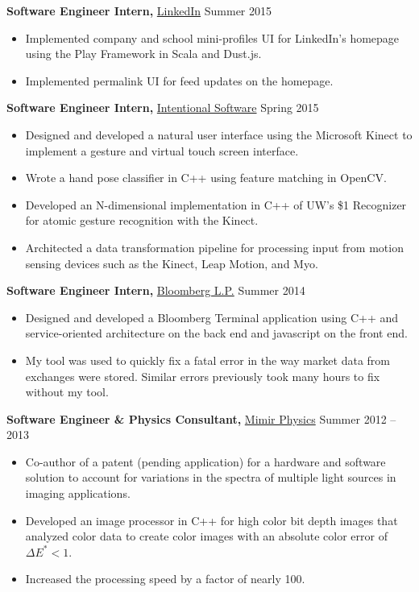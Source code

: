 \documentclass[margin]{res}
\begin{document}
\begin{minipage}{\textwidth}
\begin{resume}
{\bf Software Engineer Intern,} \uline{LinkedIn} \hfill Summer 2015
 \begin{itemize} \itemsep -2pt %
 \item Implemented company and school mini-profiles UI for LinkedIn's homepage using the Play Framework in Scala and Dust.js.
 \item Implemented permalink UI for feed updates on the homepage.
 \end{itemize}



{\bf Software Engineer Intern,} \uline{Intentional Software} \hfill Spring 2015
 \begin{itemize} \itemsep -2pt %
 \item Designed and developed a natural user interface using the Microsoft Kinect to implement a gesture and virtual touch screen interface.
 \item Wrote a hand pose classifier in C++ using feature matching in OpenCV.
 \item Developed an N-dimensional implementation in C++ of UW's \$1 Recognizer for atomic gesture recognition with the Kinect. %
 \item Architected a data transformation pipeline for processing input from motion sensing devices such as the Kinect, Leap Motion, and Myo.
 \end{itemize}



{\bf Software Engineer Intern,} \uline{Bloomberg L.P.} \hfill Summer 2014
 \begin{itemize} \itemsep -2pt
 \item Designed and developed a Bloomberg Terminal application using C++ and service-oriented architecture on the back end and javascript on the front end.
 \item My tool was used to quickly fix a fatal error in the way market data from exchanges were stored. Similar errors previously took many hours to fix without my tool.
 \end{itemize}



{\bf Software Engineer \& Physics Consultant,} \uline{Mimir Physics} \hfill Summer 2012 -- 2013
 \begin{itemize} \itemsep -2pt  %
 \item Co-author of a patent (pending application) for a hardware and software solution to account for variations in the spectra of multiple light sources in imaging applications.
 \item Developed an image processor in C++ for high color bit depth images that analyzed color data to create color images with an absolute color error of $\Delta E^* < 1$.
 \item Increased the processing speed by a factor of nearly 100.
 \end{itemize}


\end{resume}
\end{minipage}
\end{document}
